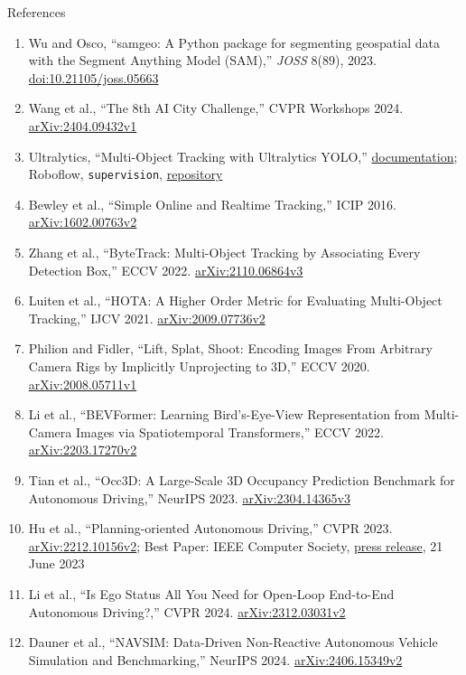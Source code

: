 \begin{frame}[allowframebreaks=0.9]{References}
\begin{enumerate}
    \item Wu and Osco, ``samgeo: A Python package for segmenting geospatial data with the Segment Anything Model (SAM),'' \textit{JOSS} 8(89), 2023. \href{https://doi.org/10.21105/joss.05663}{doi:10.21105/joss.05663}
    \item Wang et al., ``The 8th AI City Challenge,'' CVPR Workshops 2024. \href{https://arxiv.org/abs/2404.09432v1}{arXiv:2404.09432v1}
    \item Ultralytics, ``Multi-Object Tracking with Ultralytics YOLO,'' \href{https://docs.ultralytics.com/modes/track/}{documentation}; Roboflow, \texttt{supervision}, \href{https://github.com/roboflow/supervision}{repository}
    \item Bewley et al., ``Simple Online and Realtime Tracking,'' ICIP 2016. \href{https://arxiv.org/abs/1602.00763v2}{arXiv:1602.00763v2}
    \item Zhang et al., ``ByteTrack: Multi-Object Tracking by Associating Every Detection Box,'' ECCV 2022. \href{https://arxiv.org/abs/2110.06864v3}{arXiv:2110.06864v3}
    \item Luiten et al., ``HOTA: A Higher Order Metric for Evaluating Multi-Object Tracking,'' IJCV 2021. \href{https://arxiv.org/abs/2009.07736v2}{arXiv:2009.07736v2}
    \item Philion and Fidler, ``Lift, Splat, Shoot: Encoding Images From Arbitrary Camera Rigs by Implicitly Unprojecting to 3D,'' ECCV 2020. \href{https://arxiv.org/abs/2008.05711v1}{arXiv:2008.05711v1}
    \item Li et al., ``BEVFormer: Learning Bird's-Eye-View Representation from Multi-Camera Images via Spatiotemporal Transformers,'' ECCV 2022. \href{https://arxiv.org/abs/2203.17270v2}{arXiv:2203.17270v2}
    \item Tian et al., ``Occ3D: A Large-Scale 3D Occupancy Prediction Benchmark for Autonomous Driving,'' NeurIPS 2023. \href{https://arxiv.org/abs/2304.14365v3}{arXiv:2304.14365v3}
    \item Hu et al., ``Planning-oriented Autonomous Driving,'' CVPR 2023. \href{https://arxiv.org/abs/2212.10156v2}{arXiv:2212.10156v2}; Best Paper: IEEE Computer Society, \href{https://www.computer.org/press-room/cvpr2023-best-paper-winners}{press release}, 21 June 2023
    \item Li et al., ``Is Ego Status All You Need for Open-Loop End-to-End Autonomous Driving?,'' CVPR 2024. \href{https://arxiv.org/abs/2312.03031v2}{arXiv:2312.03031v2}
    \item Dauner et al., ``NAVSIM: Data-Driven Non-Reactive Autonomous Vehicle Simulation and Benchmarking,'' NeurIPS 2024. \href{https://arxiv.org/abs/2406.15349v2}{arXiv:2406.15349v2}

\end{enumerate}
\end{frame}
